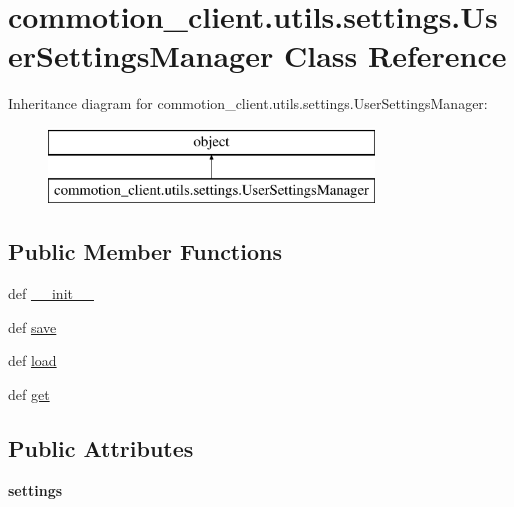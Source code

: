 \hypertarget{classcommotion__client_1_1utils_1_1settings_1_1UserSettingsManager}{\section{commotion\-\_\-client.\-utils.\-settings.\-User\-Settings\-Manager Class Reference}
\label{classcommotion__client_1_1utils_1_1settings_1_1UserSettingsManager}
}
Inheritance diagram for commotion\-\_\-client.\-utils.\-settings.\-User\-Settings\-Manager\-:\begin{figure}[H]
\begin{center}
\leavevmode
\includegraphics[height=2.000000cm]{classcommotion__client_1_1utils_1_1settings_1_1UserSettingsManager}
\end{center}
\end{figure}
\subsection*{Public Member Functions}
\begin{DoxyCompactItemize}
\item 
def \hyperlink{classcommotion__client_1_1utils_1_1settings_1_1UserSettingsManager_a51d7787bb6bdf12e72b053efc85ae14c}{\-\_\-\-\_\-init\-\_\-\-\_\-}
\item 
def \hyperlink{classcommotion__client_1_1utils_1_1settings_1_1UserSettingsManager_af215df79cfa2281e573a55bb44ca85cd}{save}
\item 
def \hyperlink{classcommotion__client_1_1utils_1_1settings_1_1UserSettingsManager_a8b3fefd45cd8d0747d32267e91d37f07}{load}
\item 
def \hyperlink{classcommotion__client_1_1utils_1_1settings_1_1UserSettingsManager_a6e67fd793c1f0c88a6d28551ba4ef4b3}{get}
\end{DoxyCompactItemize}
\subsection*{Public Attributes}
\begin{DoxyCompactItemize}
\item 
\hypertarget{classcommotion__client_1_1utils_1_1settings_1_1UserSettingsManager_aab010f5c4df9cb099aee2a9644e22058}{{\bfseries settings}}\label{classcommotion__client_1_1utils_1_1settings_1_1UserSettingsManager_aab010f5c4df9cb099aee2a9644e22058}

\end{DoxyCompactItemize}


